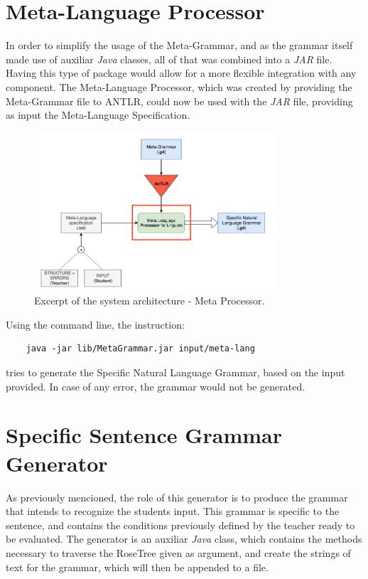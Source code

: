 \section{Meta-Language Processor}

In order to simplify the usage of the Meta-Grammar, and as the grammar itself made use of auxiliar \emph{Java} classes, all of that was combined into a \emph{JAR} file.
Having this type of package would allow for a more flexible integration with any component.
The Meta-Language Processor, which was created by providing the Meta-Grammar file to ANTLR, could now be used with the \emph{JAR} file, 
providing as input the Meta-Language Specification. 

\begin{figure}[h]
    \centering
    \includegraphics[width=9cm]{images/system_meta_processor.png}
    \caption{Excerpt of the system architecture - Meta Processor.}
    \label{fig:system_architecture}
\end{figure}

\newpage
\noindent Using the command line, the instruction:
\begin{Verbatim}
	java -jar lib/MetaGrammar.jar input/meta-lang
\end{Verbatim}
\noindent tries to generate the Specific Natural Language Grammar, based on the input provided. In case of any error, the grammar would not be generated.


\section{Specific Sentence Grammar Generator}

As previously mencioned, the role of this generator is to produce the grammar that intends to recognize the students input.
This grammar is specific to the sentence, and contains the conditions previously defined by the teacher ready to be evaluated.
The generator is an auxiliar \emph{Java} class, which contains the methods necessary to traverse the RoseTree given as argument,
and create the strings of text for the grammar, which will then be appended to a file.

